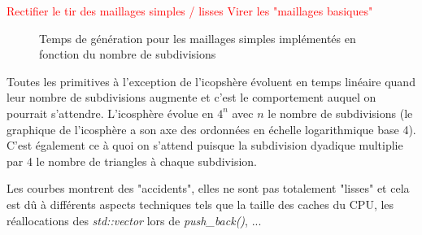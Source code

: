 \textcolor{red}{Rectifier le tir des maillages simples / lisses}
\textcolor{red}{Virer les "maillages basiques"}

\begin{figure}[h!]

	\caption{Temps de génération pour les maillages simples implémentés en fonction du nombre de subdivisions}
\end{figure}
\FloatBarrier

Toutes les primitives à l'exception de l'icopshère évoluent en temps linéaire quand leur nombre de subdivisions 
augmente et c'est le comportement auquel on pourrait s'attendre. L'icosphère évolue en $4^n$ avec $n$ le nombre 
de subdivisions (le graphique de l'icosphère a son axe des ordonnées en échelle logarithmique base 4). C'est 
également ce à quoi on s'attend puisque la subdivision dyadique multiplie par 4 le nombre de triangles à chaque subdivision.

Les courbes montrent des "accidents", elles ne sont pas totalement "lisses" et cela est dû à différents aspects techniques tels
que la taille des caches du CPU, les réallocations des \textit{std::vector} lors de \textit{push\_back()}, ...
